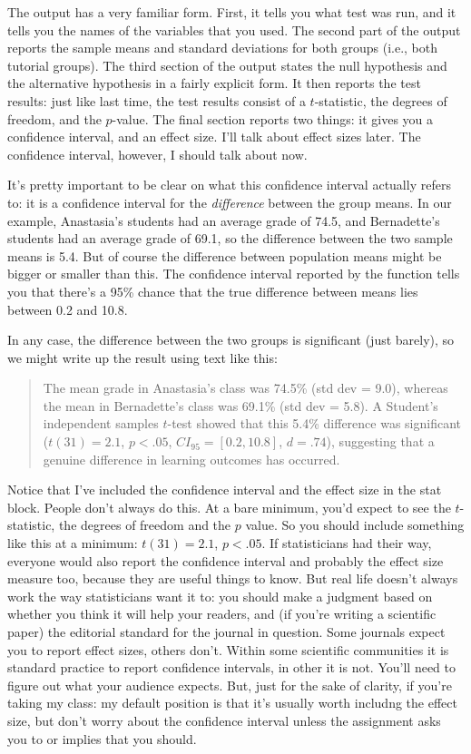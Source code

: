 The output has a very familiar form. First, it tells you what test was run, and it tells you the names of the variables that you used. The second part of the output reports the sample means and standard deviations for both groups (i.e., both tutorial groups). The third section of the output states the null hypothesis and the alternative hypothesis in a fairly explicit form. It then reports the test results: just like last time, the test results consist of a $t$-statistic, the degrees of freedom, and the $p$-value. The final section reports two things: it gives you a confidence interval, and an effect size. I'll talk about effect sizes later. The confidence interval, however, I should talk about now. 

It's pretty important to be clear on what this confidence interval actually refers to: it is a confidence interval for the {\it difference} between the group means. In our example, Anastasia's students had an average grade of 74.5, and Bernadette's students had an average grade of 69.1, so the difference between the two sample means is 5.4. But of course the difference between population means might be bigger or smaller than this. The confidence interval reported by the  function tells you that there's a 95\% chance that the true difference between means lies between 0.2 and 10.8.  

In any case, the difference between the two groups is significant (just barely), so we might write up the result using text like this:
\begin{quote}
The mean grade in Anastasia's class was 74.5\% (std dev = 9.0), whereas the mean in Bernadette's class was 69.1\% (std dev = 5.8). A Student's independent samples $t$-test showed that this 5.4\% difference was significant ($t(31) = 2.1$, $p<.05$, $CI_{95} = [0.2, 10.8]$, $d = .74$), suggesting that a genuine difference in learning outcomes has occurred.  
\end{quote}
Notice that I've included the confidence interval and the effect size in the stat block. People don't always do this. At a bare minimum, you'd expect to see the $t$-statistic, the degrees of freedom and the $p$ value. So you should include something like this at a minimum: $t(31) = 2.1$, $p<.05$. If statisticians had their way, everyone would also report the confidence interval and probably the effect size measure too, because they are useful things to know. But real life doesn't always work the way statisticians want it to: you should make a judgment based on whether you think it will help your readers, and (if you're writing a scientific paper) the editorial standard for the journal in question. Some journals expect you to report effect sizes, others don't. Within some scientific communities it is standard practice to report confidence intervals, in other it is not. You'll need to figure out what your audience expects. But, just for the sake of clarity, if you're taking my class: my default position is that it's usually worth includng the effect size, but don't worry about the confidence interval unless the assignment asks you to or implies that you should.

